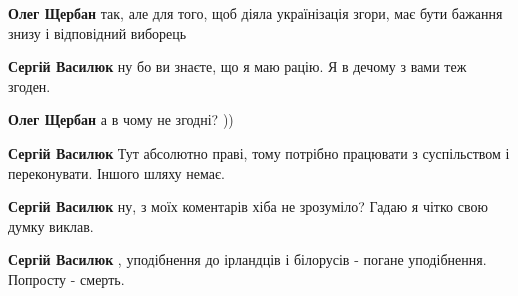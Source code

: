 \begin{itemize}
\begin{itemize}
\textbf{Олег Щербан} так, але для того, щоб діяла українізація згори, має бути бажання знизу і відповідний виборець

 
\textbf{Сергій Василюк} ну бо ви знаєте, що я маю рацію. Я в дечому з вами теж згоден.

 
\textbf{Олег Щербан} а в чому не згодні? ))

 
\textbf{Сергій Василюк} Тут абсолютно праві, тому потрібно працювати з суспільством і переконувати. Іншого шляху немає.

 
\textbf{Сергій Василюк} ну, з моїх коментарів хіба не зрозуміло? Гадаю я чітко свою думку виклав.

 
\textbf{Сергій Василюк} , уподібнення до ірландців і білорусів - погане уподібнення. Попросту - смерть.

 

\end{itemize}
\end{itemize}
